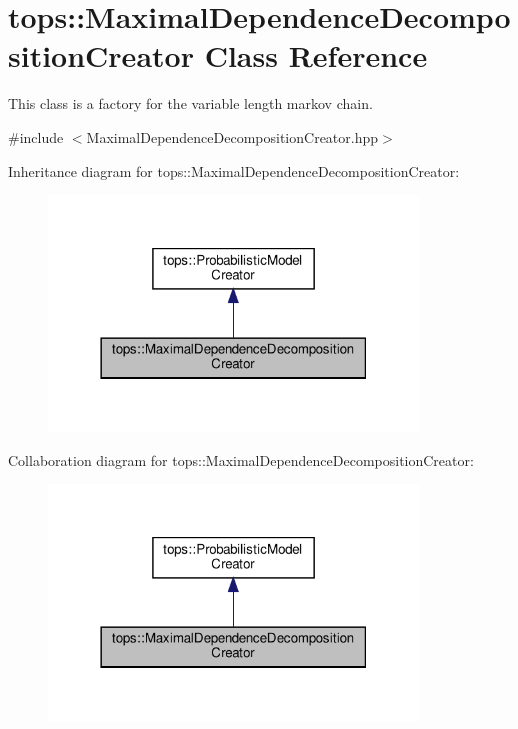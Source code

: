 \hypertarget{classtops_1_1MaximalDependenceDecompositionCreator}{}\section{tops\+:\+:Maximal\+Dependence\+Decomposition\+Creator Class Reference}
\label{classtops_1_1MaximalDependenceDecompositionCreator}


This class is a factory for the variable length markov chain.  




{\ttfamily \#include $<$Maximal\+Dependence\+Decomposition\+Creator.\+hpp$>$}



Inheritance diagram for tops\+:\+:Maximal\+Dependence\+Decomposition\+Creator\+:
\nopagebreak
\begin{figure}[H]
\begin{center}
\leavevmode
\includegraphics[width=278pt]{classtops_1_1MaximalDependenceDecompositionCreator__inherit__graph}
\end{center}
\end{figure}


Collaboration diagram for tops\+:\+:Maximal\+Dependence\+Decomposition\+Creator\+:
\nopagebreak
\begin{figure}[H]
\begin{center}
\leavevmode
\includegraphics[width=278pt]{classtops_1_1MaximalDependenceDecompositionCreator__coll__graph}
\end{center}
\end{figure}

